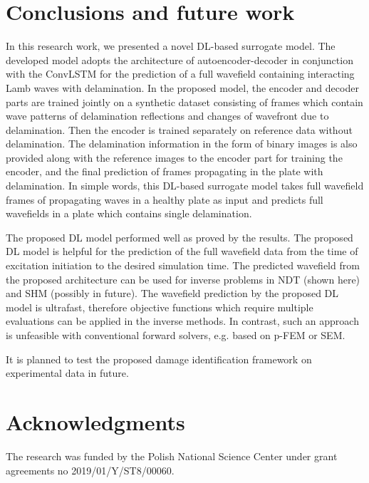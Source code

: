 \documentclass[sn-mathphys-num]{sn-jnl}%
\begin{document}
	\section{Conclusions and future work}
	\label{conclusion}
	In this research work, we presented a novel DL-based surrogate model. 
	The developed model adopts the architecture of autoencoder-decoder in 
	conjunction with the ConvLSTM for the prediction of a full wavefield 
	containing interacting Lamb waves with delamination. 
	In the proposed model, the encoder and decoder parts are trained jointly on 
	a synthetic dataset consisting of frames which contain wave patterns of 
	delamination reflections and changes of wavefront due to delamination. 
	Then the encoder is trained separately on reference data without 
	delamination. 
	The delamination information in the form of binary images is also provided 
	along with the reference images to the encoder part for training the 
	encoder, and the final prediction of frames propagating in the plate with 
	delamination.
	In simple words, this DL-based surrogate model takes full wavefield frames 
	of propagating waves in a healthy plate as input and predicts full 
	wavefields in a plate which contains single delamination.
	
	The proposed DL model performed well as proved by the results.
	The proposed DL model is helpful for the prediction of the full wavefield 
	data from the time of excitation initiation to the desired simulation time. 
	The predicted wavefield from the proposed architecture can be used for 
	inverse problems in NDT (shown here) and SHM (possibly in future).
	The wavefield prediction by the proposed DL model is ultrafast, therefore 
	objective functions which require multiple evaluations can be applied in 
	the inverse methods.
	In contrast, such an approach is unfeasible with conventional forward 
	solvers, e.g. based on p-FEM or SEM. 
	
	It is planned to test the proposed damage identification framework on 
	experimental data in future.
	
	\clearpage	
	\section*{Acknowledgments}
	The research was funded by the Polish National Science Center under grant agreements no 2019/01/Y/ST8/00060.
	
\end{document}
